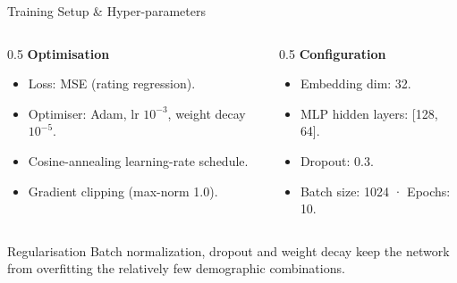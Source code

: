 \documentclass[aspectratio=169]{beamer}
\begin{document}
\begin{frame}{Training Setup \& Hyper-parameters}
\begin{columns}[T]
  \begin{column}{0.5\textwidth}
    \textbf{Optimisation}
    \begin{itemize}
      \item Loss: MSE (rating regression).
      \item Optimiser: Adam, lr $10^{-3}$, weight decay $10^{-5}$.
      \item Cosine-annealing learning-rate schedule.
      \item Gradient clipping (max-norm 1.0).
    \end{itemize}
  \end{column}
  \begin{column}{0.5\textwidth}
    \textbf{Configuration}
    \begin{itemize}
      \item Embedding dim: 32.
      \item MLP hidden layers: [128, 64].
      \item Dropout: 0.3.
      \item Batch size: 1024 · Epochs: 10.
    \end{itemize}
  \end{column}
\end{columns}

\vspace{0.25cm}
\begin{block}{Regularisation}
Batch normalization, dropout and weight decay keep the network from overfitting the relatively few demographic combinations.
\end{block}
\end{frame}
\end{document}
